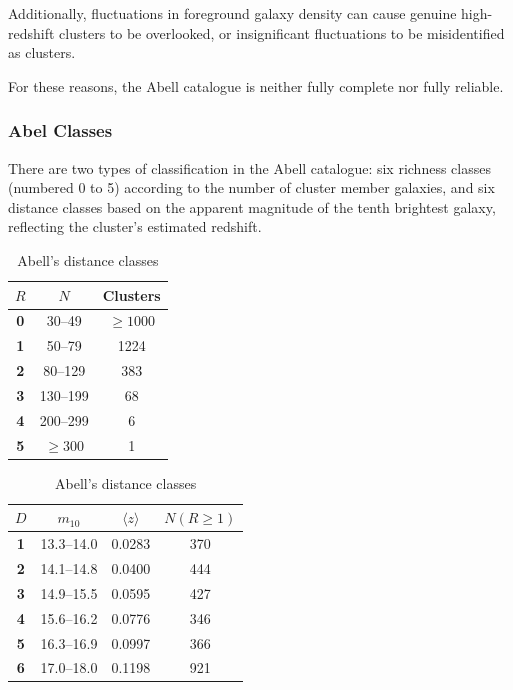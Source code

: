 Additionally, fluctuations in foreground galaxy density can cause genuine high-redshift clusters to be overlooked, or insignificant fluctuations to be misidentified as clusters.

For these reasons, the Abell catalogue is neither fully complete nor fully reliable.

\subsubsection{Abel Classes}

There are two types of classification in the Abell catalogue: six richness classes (numbered 0 to 5) according to the number of cluster member galaxies, and six distance classes based on the apparent magnitude of the tenth brightest galaxy, reflecting the cluster's estimated redshift.

\begin{table}[H]
    \centering
    \setlength{\tabcolsep}{18pt}
    \begin{minipage}[t]{0.49\textwidth}
        \centering
        \footnotesize
        \captionsetup{justification=centering}
        \caption{Abell's richness classes}
        \label{tab:abell-richness}
        \renewcommand{\arraystretch}{1.15}
        \begin{tabular}{>{\bfseries}c c c}
        $R$ & $N$ & Clusters \\
        \hline
        0 & 30--49     & $\geq 1000$ \\
        1 & 50--79     & 1224 \\
        2 & 80--129    & 383 \\
        3 & 130--199   & 68 \\
        4 & 200--299   & 6 \\
        5 & $\geq 300$ & 1 \\
        \end{tabular}
    \end{minipage}%
    \hfill
    \setlength{\tabcolsep}{10pt}
    \begin{minipage}[t]{0.49\textwidth}
        \centering
        \footnotesize
        \captionsetup{justification=centering}
        \caption{Abell's distance classes}
        \label{tab:abell-distance}
        \renewcommand{\arraystretch}{1.15}
        \begin{tabular}{>{\bfseries}c c c c}
        $D$ & $m_{10}$ & $\langle z \rangle$ & $N(R\!\geq\!1)$\\
        \hline
        1 & 13.3--14.0 & 0.0283 & 370 \\
        2 & 14.1--14.8 & 0.0400 & 444 \\
        3 & 14.9--15.5 & 0.0595 & 427 \\
        4 & 15.6--16.2 & 0.0776 & 346 \\
        5 & 16.3--16.9 & 0.0997 & 366 \\
        6 & 17.0--18.0 & 0.1198 & 921 \\
        \end{tabular}
    \end{minipage}
\end{table}

